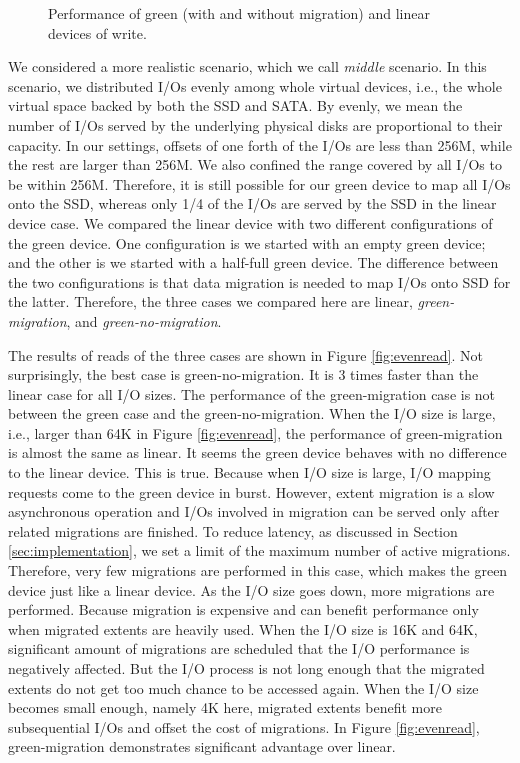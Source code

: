 \begin{figure}[t]
\begin{centering}
\caption{Performance of green (with and without migration) and linear
devices of write.}
\label{fig:evenwrite}
\end{centering}
\end{figure}

We considered a more realistic scenario, which we call \textit{middle}
scenario. In this scenario, we distributed I/Os evenly among whole
virtual devices, i.e., the whole virtual space backed by both the SSD
and SATA.  By evenly, we mean the number of I/Os served by the
underlying physical disks are proportional to their capacity.  In our
settings, offsets of one forth of the I/Os are less than 256M, while
the rest are larger than 256M.  We also confined the range covered by
all I/Os to be within 256M.  Therefore, it is still possible for our
green device to map all I/Os onto the SSD, whereas only 1/4 of the
I/Os are served by the SSD in the linear device case.  We compared the
linear device with two different configurations of the green device.
One configuration is we started with an empty green device; and the
other is we started with a half-full green device. The difference
between the two configurations is that data migration is needed to map
I/Os onto SSD for the latter. Therefore, the three cases we compared
here are linear, \textit{green-migration}, and
\textit{green-no-migration}.

The results of reads of the three cases are shown in Figure
\ref{fig:evenread}. Not surprisingly, the best case is
green-no-migration. It is 3 times faster than the linear case for all
I/O sizes. The performance of the green-migration case is not between
the green case and the green-no-migration. When the I/O size is large,
i.e., larger than 64K in Figure \ref{fig:evenread}, the performance of
green-migration is almost the same as linear. It seems the green
device behaves with no difference to the linear device. This is true.
Because when I/O size is large, I/O mapping requests come to the green
device in burst. However, extent migration is a slow asynchronous
operation and I/Os involved in migration can be served only after
related migrations are finished. To reduce latency, as discussed in
Section \ref{sec:implementation}, we set a limit of the maximum number
of active migrations. Therefore, very few migrations are performed in
this case, which makes the green device just like a linear device.  As
the I/O size goes down, more migrations are performed. Because
migration is expensive and can benefit performance only when migrated
extents are heavily used. When the I/O size is 16K and 64K,
significant amount of migrations are scheduled that the I/O
performance is negatively affected. But the I/O process is not long
enough that the migrated extents do not get too much chance to be
accessed again. When the I/O size becomes small enough, namely 4K
here, migrated extents benefit more subsequential I/Os and offset the
cost of migrations. In Figure \ref{fig:evenread}, green-migration
demonstrates significant advantage over linear.

